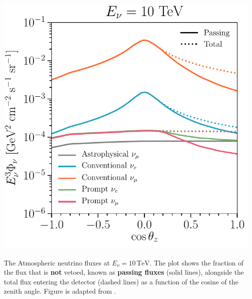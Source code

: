 \begin{marginfigure}
	\includegraphics{./figures/EventSample/fig1_fluxes_10.pdf}
	\caption{The Atmospheric neutrino fluxes at \( E_\nu = 10 \, \text{TeV} \). The plot shows the fraction of the flux that is \textbf{not} vetoed, known as \textbf{passing fluxes} (solid lines), alongside the total flux entering the detector (dashed lines) as a function of the cosine of the zenith angle. Figure is adapted from \cite{pass_frac}.}
\end{marginfigure}

